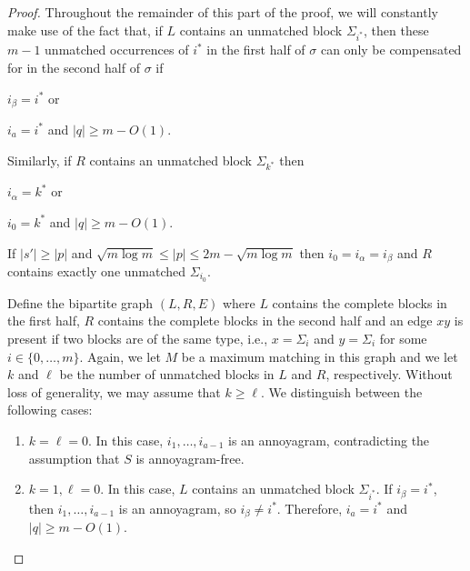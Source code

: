 \documentclass[kpfonts]{patmorin}
\begin{document}
\begin{proof}
    Throughout the remainder of this part of the proof, we will constantly make use of the fact that, if $L$ contains an unmatched block $\Sigma_{i^*}$, then these $m-1$ unmatched occurrences of $i^*$ in the first half of $\sigma$ can only be compensated for in the second half of $\sigma$ if
    \begin{inparaenum}
        \item $i_\beta=i^*$ or
        \item $i_a=i^*$ and $|q|\ge m-O(1)$.
    \end{inparaenum}
    Similarly, if $R$ contains an unmatched block $\Sigma_{k^*}$ then
    \begin{inparaenum}
        \item $i_\alpha=k^*$ or
        \item $i_0=k^*$ and $|q|\ge m-O(1)$.
    \end{inparaenum}


    \begin{clm}\label{weirdo}
        If $|s'|\ge |p|$ and $\sqrt{m\log m} \le |p| \le 2m-\sqrt{m\log m}$ then $i_0=i_\alpha=i_\beta$ and $R$ contains exactly one unmatched $\Sigma_{i_0}$.
    \end{clm}

    Define the bipartite graph $(L,R,E)$ where $L$ contains the complete blocks in the first half, $R$ contains the complete blocks in the second half and an edge $xy$ is present if two blocks are of the same type, i.e., $x=\Sigma_i$ and $y=\Sigma_i$ for some $i\in\{0,\ldots,m\}$.  Again, we let $M$ be a maximum matching in this graph and we let $k$ and $\ell$ be the number of unmatched blocks in $L$ and $R$, respectively.  Without loss of generality, we may assume that $k\ge\ell$.   We distinguish between the following cases:
    \begin{enumerate}
        \item $k=\ell=0$.  In this case, $i_1,\ldots,i_{a-1}$ is an annoyagram, contradicting the assumption that $S$ is annoyagram-free.

        \item $k=1,\ell=0$.  In this case, $L$ contains an unmatched block $\Sigma_{i^*}$.  If $i_\beta=i^*$, then $i_1,\ldots,i_{a-1}$ is an annoyagram, so $i_\beta\neq i^*$. Therefore, $i_a=i^*$ and $|q|\ge m-O(1)$.


\end{enumerate}
\end{proof}
\end{document}
